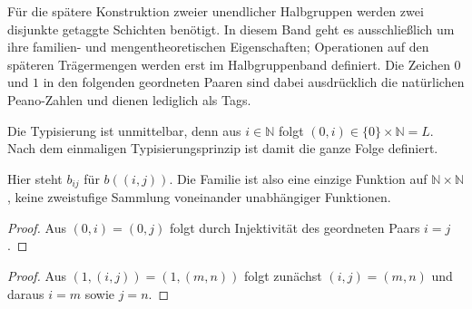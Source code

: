 \documentclass[main.tex]{subfiles}
\begin{document}
Für die spätere Konstruktion zweier unendlicher Halbgruppen werden zwei
disjunkte getaggte Schichten benötigt. In diesem Band geht es ausschließlich
um ihre familien- und mengentheoretischen Eigenschaften; Operationen auf den
späteren Trägermengen werden erst im Halbgruppenband definiert.
Die Zeichen \(0\) und \(1\) in den folgenden geordneten Paaren sind dabei
ausdrücklich die natürlichen Peano-Zahlen und dienen lediglich als Tags.




Die Typisierung ist unmittelbar, denn aus \(i\in\mathbb N\) folgt
\((0,i)\in\{0\}\times\mathbb N=L\). Nach dem einmaligen
Typisierungsprinzip ist damit die ganze Folge definiert.


Hier steht \(b_{ij}\) für \(b((i,j))\). Die Familie ist also eine einzige
Funktion auf \(\mathbb N\times\mathbb N\), keine zweistufige Sammlung
voneinander unabhängiger Funktionen.

\begin{proof}
Aus \((0,i)=(0,j)\) folgt durch Injektivität des geordneten Paars
\(i=j\).
\end{proof}

\begin{proof}
Aus \((1,(i,j))=(1,(m,n))\) folgt zunächst \((i,j)=(m,n)\) und daraus
\(i=m\) sowie \(j=n\).
\end{proof}
\end{document}
